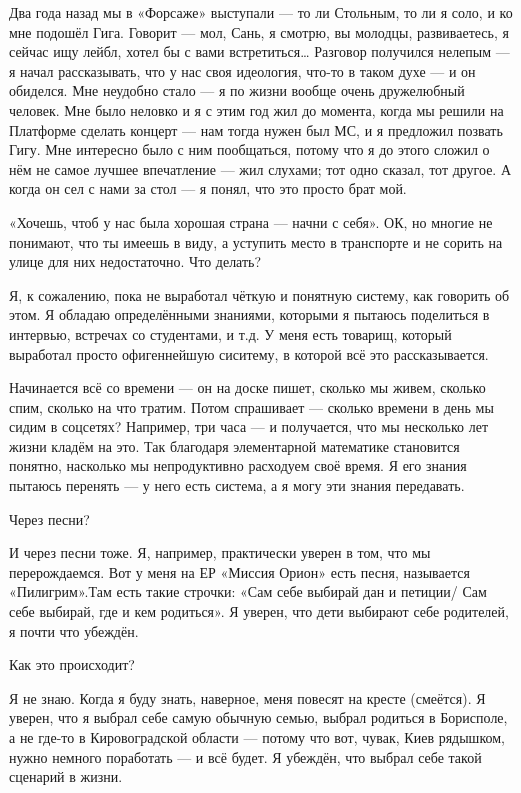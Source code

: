 Два года назад мы в «Форсаже» выступали --- то ли Стольным, то ли я соло, и ко мне подошёл Гига. Говорит --- мол, Сань, я смотрю, вы молодцы, развиваетесь, я сейчас ищу лейбл, хотел бы с вами встретиться… Разговор получился нелепым --- я начал рассказывать, что у нас своя идеология, что-то в таком духе --- и он обиделся. Мне неудобно стало --- я по жизни вообще очень дружелюбный человек. Мне было неловко и я с этим год жил до момента, когда мы решили на Платформе сделать концерт --- нам тогда нужен был МС, и я предложил позвать Гигу. Мне интересно было с ним пообщаться, потому что я до этого сложил о нём не самое лучшее впечатление --- жил слухами; тот одно сказал, тот другое. А когда он сел с нами за стол --- я понял, что это просто брат мой.

«Хочешь, чтоб у нас была хорошая страна --- начни с себя». ОК, но многие не понимают, что ты имеешь в виду, а уступить место в транспорте и не сорить на улице для них недостаточно. Что делать?

Я, к сожалению, пока не выработал чёткую и понятную систему, как говорить об этом. Я обладаю определёнными знаниями, которыми я пытаюсь поделиться в интервью, встречах со студентами, и т.д. У меня есть товарищ, который выработал просто офигеннейшую сиситему, в которой всё это рассказывается.

Начинается всё со времени --- он на доске пишет, сколько мы живем, сколько спим, сколько на что тратим. Потом спрашивает --- сколько времени в день мы сидим в соцсетях? Например, три часа --- и получается, что мы несколько лет жизни кладём на это. Так благодаря элементарной математике становится понятно, насколько мы непродуктивно расходуем своё время. Я его знания пытаюсь перенять --- у него есть система, а я могу эти знания передавать.

Через песни?

И через песни тоже. Я, например, практически уверен в том, что мы перерождаемся. Вот у меня на ЕР «Миссия Орион» есть песня, называется «Пилигрим».Там есть такие строчки: «Сам себе выбирай дан и петиции/ Сам себе выбирай, где и кем родиться». Я уверен, что дети выбирают себе родителей, я почти что убеждён.

Как это происходит?

Я не знаю. Когда я буду знать, наверное, меня повесят на кресте (смеётся). Я
уверен, что я выбрал себе самую обычную семью, выбрал родиться в Борисполе, а
не где-то в Кировоградской области --- потому что вот, чувак, Киев рядышком,
нужно немного поработать --- и всё будет. Я убеждён, что выбрал себе такой
сценарий в жизни.

